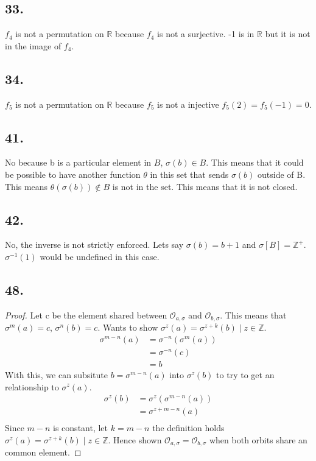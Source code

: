 \documentclass{article}
\begin{document}
\subsection*{33. }
$f_4$ is not a permutation on $\mathbb{R}$ because $f_4$ is not a surjective. -1
is in $\mathbb{R}$ but it is not in the image of $f_4$.

\subsection*{34. }
$f_5$ is not a permutation on $\mathbb{R}$ because $f_5$ is not a injective
$f_5(2) = f_5(-1) = 0$.

\subsection*{41. }
No because b is a particular element in $B$, $\sigma(b) \in B$. This means that 
it could be possible to have another function $\theta$ in this set that sends
$\sigma(b)$ outside of B. This means $\theta(\sigma(b)) \not\in B$ is not in the
set. This means that it is not closed.

\subsection*{42. }
No, the inverse is not strictly enforced. Lets say $\sigma(b) = b+1$ and
$\sigma[B] = \mathbb{Z}^+$. $\sigma^{-1}(1)$ would be undefined in this case.

\subsection*{48. }
\begin{proof} Let c be the element shared between $\mathcal{O}_{a, \sigma}$ and
$\mathcal{O}_{b, \sigma}$. This means that $\sigma^m(a) = c$, $\sigma^n(b) = c$.
Wants to show $\sigma^z(a) = \sigma^{z+k}(b) \mid z \in \mathbb{Z}$.
\begin{align*}
	\sigma^{m-n}(a) &= \sigma^{-n}(\sigma^{m}(a)) \\
								  &= \sigma^{-n}(c) \\
								  &= b
\end{align*}
With this, we can subsitute $b = \sigma^{m-n}(a)$ into $\sigma^z(b)$ to try
to get an relationship to $\sigma^z(a)$.
\begin{align*}
	\sigma^z(b) &= \sigma^z(\sigma^{m-n}(a)) \\
							&= \sigma^{z+m-n}(a) \\
\end{align*}
Since $m-n$ is constant, let $k = m-n$ the definition holds $\sigma^z(a) =
\sigma^{z+k}(b) \mid z \in \mathbb{Z}$. Hence shown $\mathcal{O}_{a,\sigma} =
\mathcal{O}_{b,\sigma}$ when both orbits share an common element.
\end{proof}
\end{document}
